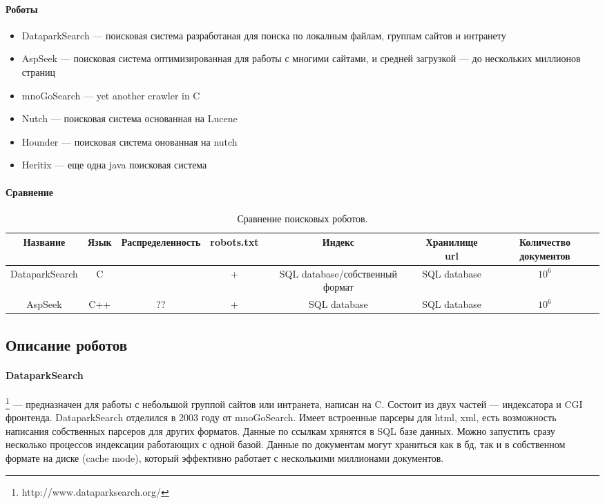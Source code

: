 \paragraph{Роботы}
\begin{itemize}
 \item DataparkSearch --- поисковая система разработаная для поиска по локалным файлам, группам сайтов и интранету
 \item AspSeek --- поисковая система оптимизированная для работы с многими сайтами, и средней загрузкой --- до нескольких миллионов страниц
 \item mnoGoSearch --- yet another crawler in C
 \item Nutch --- поисковая система основанная на Lucene
 \item Hounder --- поисковая система онованная на nutch
 \item Heritix --- еще одна java поисковая система
\end{itemize}
\paragraph{Сравнение}
\begin{table}[h]
\caption{\label{tab:crawlers}Сравнение поисковых роботов.}
\begin{center}
\begin{tabular}{|c|c|c|c|c|c|c|}
\hline
Название & Язык & Распределенность & robots.txt & Индекс & Хранилище url & Количество документов\\
\hline
DataparkSearch & C & ~ & + & SQL database/собственный формат & SQL database & $10^{6}$\\
\hline
AspSeek & C++ & ?? & + & SQL database & SQL database & $10^{6}$\\
\hline
\end{tabular}
\end{center}
\end{table}
\subsection{Описание роботов}
\paragraph{DataparkSearch}\footnote{http://www.dataparksearch.org/} --- предназначен для работы с небольшой группой сайтов или интранета, написан на C. Состоит из двух частей --- индексатора и CGI фронтенда. DataparkSearch отделился в 2003 году от mnoGoSearch. Имеет встроенные парсеры для html, xml, есть возможность написания собственных парсеров для других форматов. Данные по ссылкам хрянятся в SQL базе данных. Можно запустить сразу несколько процессов индексации работающих с одной базой. Данные по документам могут храниться как в бд, так и в собственном формате на диске (cache mode), который эффективно работает с несколькими миллионами документов.
